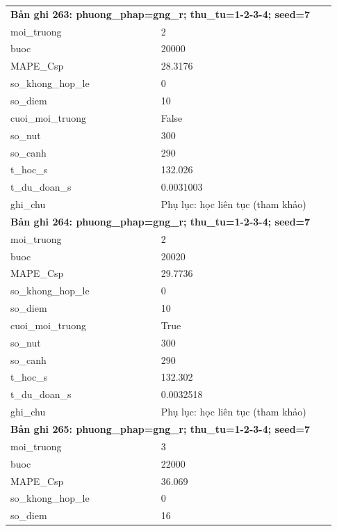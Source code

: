 \begin{longtable}{p{0.43\linewidth}p{0.50\linewidth}}
\midrule
\multicolumn{2}{p{0.95\linewidth}}{\textbf{Bản ghi 263: phuong\_phap=gng\_r; thu\_tu=1-2-3-4; seed=7}} \\
moi\_\allowbreak truong & 2 \\
buoc & 20000 \\
MAPE\_\allowbreak Csp & 28.3176 \\
so\_\allowbreak khong\_\allowbreak hop\_\allowbreak le & 0 \\
so\_\allowbreak diem & 10 \\
cuoi\_\allowbreak moi\_\allowbreak truong & False \\
so\_\allowbreak nut & 300 \\
so\_\allowbreak canh & 290 \\
t\_\allowbreak hoc\_\allowbreak s & 132.026 \\
t\_\allowbreak du\_\allowbreak doan\_\allowbreak s & 0.0031003 \\
ghi\_\allowbreak chu & Phụ lục: học liên tục (tham khảo) \\
\midrule
\multicolumn{2}{p{0.95\linewidth}}{\textbf{Bản ghi 264: phuong\_phap=gng\_r; thu\_tu=1-2-3-4; seed=7}} \\
moi\_\allowbreak truong & 2 \\
buoc & 20020 \\
MAPE\_\allowbreak Csp & 29.7736 \\
so\_\allowbreak khong\_\allowbreak hop\_\allowbreak le & 0 \\
so\_\allowbreak diem & 10 \\
cuoi\_\allowbreak moi\_\allowbreak truong & True \\
so\_\allowbreak nut & 300 \\
so\_\allowbreak canh & 290 \\
t\_\allowbreak hoc\_\allowbreak s & 132.302 \\
t\_\allowbreak du\_\allowbreak doan\_\allowbreak s & 0.0032518 \\
ghi\_\allowbreak chu & Phụ lục: học liên tục (tham khảo) \\
\midrule
\multicolumn{2}{p{0.95\linewidth}}{\textbf{Bản ghi 265: phuong\_phap=gng\_r; thu\_tu=1-2-3-4; seed=7}} \\
moi\_\allowbreak truong & 3 \\
buoc & 22000 \\
MAPE\_\allowbreak Csp & 36.069 \\
so\_\allowbreak khong\_\allowbreak hop\_\allowbreak le & 0 \\
so\_\allowbreak diem & 16 \\

\end{longtable}
